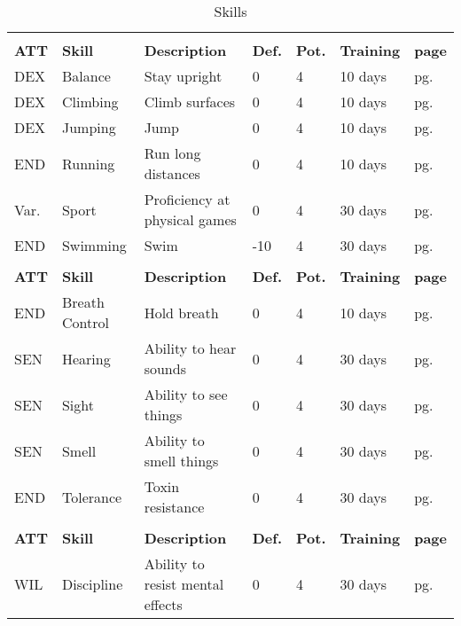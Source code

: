 \begin{center}
    \unclassedrowcolors
    \begin{xltabular}{\textwidth}{l l X l l l l}
        \caption{Skills}\label{tab:skills} \endfoot
         \\*
        \textbf{ATT} & \textbf{Skill} & \textbf{Description} & \textbf{Def.} & \textbf{Pot.} & \textbf{Training} & \textbf{page} \\*
        DEX & Balance & Stay upright & 0 & 4 & 10 days & pg. \pageref{skill:balance} \\
        DEX & Climbing & Climb surfaces & 0 & 4 & 10 days & pg. \pageref{skill:climbing} \\
        DEX & Jumping & Jump & 0 & 4 & 10 days & pg. \pageref{skill:jumping} \\
        END & Running & Run long distances & 0 & 4 & 10 days & pg. \pageref{skill:running} \\
        Var. & Sport & Proficiency at physical games & 0 & 4 & 30 days & pg. \pageref{skill:sport} \\
        END & Swimming & Swim & -10 & 4 & 30 days & pg. \pageref{skill:swimming} \\
         \\*
        \textbf{ATT} & \textbf{Skill} & \textbf{Description} & \textbf{Def.} & \textbf{Pot.} & \textbf{Training} & \textbf{page} \\*
        END & Breath Control & Hold breath & 0 & 4 & 10 days & pg. \pageref{skill:hearing} \\
        SEN & Hearing & Ability to hear sounds & 0 & 4 & 30 days & pg. \pageref{skill:hearing} \\
        SEN & Sight & Ability to see things & 0 & 4 & 30 days & pg. \pageref{skill:sight} \\
        SEN & Smell & Ability to smell things & 0 & 4 & 30 days & pg. \pageref{skill:smell} \\
        END & Tolerance & Toxin resistance & 0 & 4 & 30 days & pg. \pageref{skill:tolerance} \\
         \\*
        \textbf{ATT} & \textbf{Skill} & \textbf{Description} & \textbf{Def.} & \textbf{Pot.} & \textbf{Training} & \textbf{page} \\*
        WIL & Discipline & Ability to resist mental effects & 0 & 4 & 30 days & pg. \pageref{skill:self-control} \\

\end{xltabular}
\end{center}
